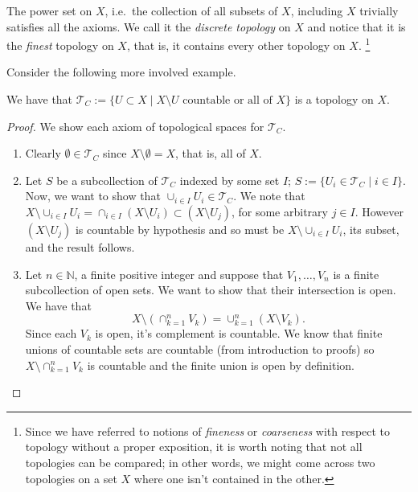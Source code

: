\begin{exmp}
  \label{exmp:discrete}
  The power set on $X$, i.e.\ the collection of all subsets of $X$,
  including $X$ trivially satisfies all the axioms. We call it the
  \emph{discrete topology} on $X$ and notice that it is the
  \emph{finest} topology on $X$, that is, it contains every other
  topology on $X$. \footnote{Since we have referred to notions of \emph{fineness} or 
\emph{coarseness} with respect to topology without a proper
exposition, it is worth noting that not all topologies can be
compared; in other words, we might come across two topologies on a set
$X$ where one isn't contained in the other.}
\end{exmp}


Consider the following more involved example.

\begin{exmp}
  \label{exmp:countable}
  We have that $\mathscr{T}_C := \{U \subset X \mid X \setminus U
  \text{ countable or all of } X \}$ is a topology on $X$.
\end{exmp}

\begin{proof} 
  We show each axiom of topological spaces for $\mathscr{T}_C$.
  \begin{enumerate}
  \item Clearly $\emptyset \in \mathscr{T}_C$ since $X \setminus
    \emptyset = X$, that is, all of $X$.
  \item Let $S$ be a subcollection of $\mathscr{T}_C$ indexed by some
    set $I$; $S := \{U_i \in \mathscr{T}_C \mid i \in I \}$. Now, we
    want to show that $\cup_{i \in I} U_i \in \mathscr{T}_C$. We note
    that $X \setminus \cup_{i \in I} U_i = \cap_{i \in I}(X \setminus
    U_i) \subset (X \setminus U_j)$, for some arbitrary $j \in
    I$. However $(X \setminus U_j)$ is countable by hypothesis and so
    must be $X \setminus \cup_{i \in I} U_i$, its subset, and the
    result follows.
  \item Let $n \in \mathbb{N}$, a finite positive integer and suppose
    that $V_1, \dots, V_n$ is a finite subcollection of open sets. We
    want to show that their intersection is open. We have that
    \[
      X \setminus (\cap_{k=1}^n V_k) = \cup_{k=1}^n (X \setminus V_k).
    \]
    Since each $V_k$ is open, it's complement is countable. We know
    that finite unions of countable sets are countable (from
    introduction to proofs) so $X \setminus \cap_{k=1}^n V_k$ is   
    countable and the finite union is open by definition.
  \end{enumerate}
\end{proof}

